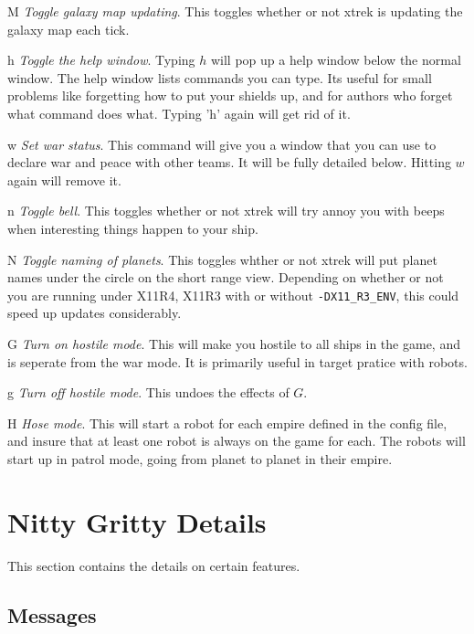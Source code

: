 \begin{list}{}{
	\renewcommand{\makelabel}[1]{{\tt #1 \hfill}}
         \setlength{\leftmargin}{.5in}
         \setlength{\labelwidth}{\leftmargin}
         \setlength{\labelsep}{0in}
}
\item[M]{\em Toggle galaxy map updating}.
This toggles whether or not xtrek is updating the galaxy map each tick.

\item[h]{\em Toggle the help window}.
Typing $h$ will pop up a help window below the normal window.  The help
window lists commands you can type.  Its useful for small problems
like forgetting how to put your shields up, and for authors who forget
what command does what.  Typing 'h' again will get rid of it.

\item[w]{\em Set war status}.
This command will give you a window that you can use to declare
war and peace with other teams.  It will be fully detailed below.
Hitting $w$ again will remove it.

\item[n]{\em Toggle bell}.
This toggles whether or not xtrek will try annoy you with beeps when
interesting things happen to your ship.

\item[N]{\em Toggle naming of planets}.
This toggles whther or not xtrek will put planet names under the circle
on the short range view. Depending on whether or not you are running
under X11R4, X11R3 with or without \verb|-DX11_R3_ENV|, this could speed
up updates considerably.

\item[G]{\em Turn on hostile mode}.
This will make you hostile to all ships in the game, and is seperate from
the war mode. It is primarily useful in target pratice with robots.

\item[g]{\em Turn off hostile mode}.
This undoes the effects of $G$.

\item [H]{\em Hose mode}.
This will start a robot for each empire defined in the config file, and insure
that at least one robot is always on the game for each. The robots will start
up in patrol mode, going from planet to planet in their empire.
\end{list}

\section{Nitty Gritty Details}

This section contains the details on certain features.

\subsection{Messages}

